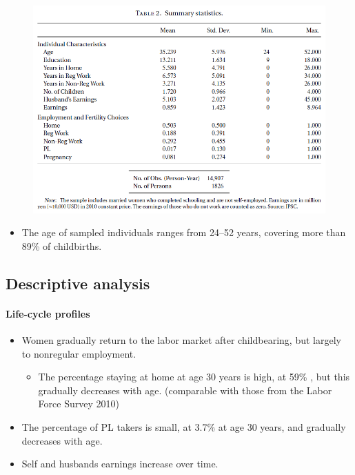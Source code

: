 \documentclass[../root]{subfiles}
\begin{document}
    \begin{figure}[h]
      \centering
      \includegraphics[scale = 1]{0619tanji/T2}
      \label{T2}
    \end{figure}

    \begin{itemize}
      \item The age of sampled individuals ranges from 24–52 years, covering more than 89\% of childbirths.
    \end{itemize}


    \subsection{Descriptive analysis}

    \paragraph{Life-cycle profiles}

    \begin{itemize}
      \item Women gradually return to the labor market after childbearing, but largely to nonregular employment.
      \begin{itemize}
        \item The percentage staying at home at age 30 years is high, at 59\% , but this gradually decreases with age. (comparable with those from the Labor Force Survey 2010)
      \end{itemize}
      \item The percentage of PL takers is small, at 3.7\% at age 30 years, and gradually decreases with age.
      \item Self and husbands earnings increase over time.
    \end{itemize}
\end{document}
